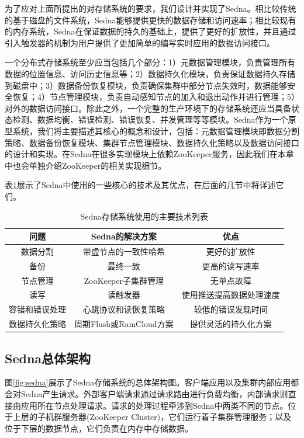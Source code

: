 为了应对上面所提出的对存储系统的要求，我们设计并实现了Sedna。相比较传统的基于磁盘的文件系统，Sedna能够提供更快的数据存储和访问速率；相比较现有的内存系统，Sedna在保证数据的持久的基础上，提供了更好的扩放性，并且通过引入触发器的机制为用户提供了更加简单的编写实时应用的数据访问接口。

一个分布式存储系统至少应当包括几个部分：1）元数据管理模块，负责管理所有数据的位置信息、访问历史信息等；2）数据持久化模块，负责保证数据持久存储到磁盘中；3）数据备份恢复模块，负责确保集群中部分节点失效时，数据能够安全恢复；4）节点管理模块，负责自动感知节点的加入和退出动作并进行管理；5）对外的数据访问接口。除此之外，一个完整的生产环境下的存储系统还应当具备状态检测、数据均衡、错误检测、错误恢复、并发管理等等模块。Sedna作为一个原型系统，我们将主要描述其核心的概念和设计，包括：元数据管理模块即数据分割策略、数据备份恢复模块、集群节点管理模块、数据持久化策略以及数据访问接口的设计和实现。在Sedna在很多实现模块上依赖ZooKeeper服务，因此我们在本章中也会单独介绍ZooKeeper的相关实现细节。

表\ref{table:sednatech}展示了Sedna中使用的一些核心的技术及其优点，在后面的几节中将详述它们。


\begin{table}[h!]\small
\caption{Sedna存储系统使用的主要技术列表}
\label{table:sednatech}
\centering
\begin{tabular}{|c|c|c|}
\hline
\textbf{问题} & \textbf{Sedna的解决方案} & \textbf{优点}\\
\hline
数据分割& 带虚节点的一致性哈希 & 更好的扩放性\\
\hline
备份 & 最终一致 & 更高的读写速率\\
\hline
节点管理  & ZooKeeper子集群管理 & 无单点故障\\
\hline
 读写 & 读触发器 & 使用推送提高数据处理速度 \\
 \hline
 容错和错误处理& 心跳协议和读恢复策略 & 较低的错误发现时间\\
\hline
 数据持久化策略& 周期Flush或RamCloud方案 & 提供灵活的持久化方案\\
\hline
\end{tabular}
\end{table}

\subsection{Sedna总体架构}

图\ref{fig:sedna}展示了Sedna存储系统的总体架构图。客户端应用以及集群内部应用都会对Sedna产生请求。外部客户端请求通过请求路由进行负载均衡，内部请求则直接由应用所在节点处理请求。请求的处理过程牵涉到Sedna中两类不同的节点。位于上层的子机群服务器(ZooKeeper Cluster)，它们运行着子集群管理服务；以及位于下层的数据节点，它们负责在内存中存储数据。


